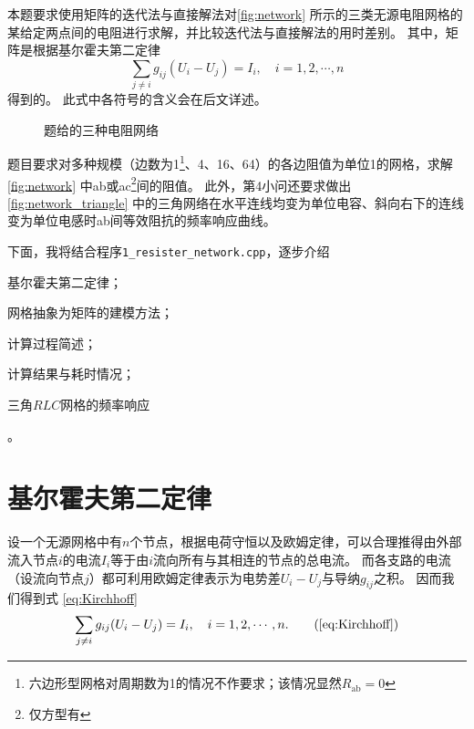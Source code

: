 本题要求使用矩阵的迭代法与直接解法对\autoref{fig:network} 所示的三类无源电阻网格的某给定两点间的电阻进行求解，并比较迭代法与直接解法的用时差别。
其中，矩阵是根据基尔霍夫第二定律
\begin{equation}\label{eq:Kirchhoff}
    \sum_{j\neq i} {g_{ij}(U_i-U_j)} = I_i,\quad i=1,2,\cdots,n
\end{equation}
得到的。
此式中各符号的含义会在后文详述。

\begin{figure}
    \centering
    \caption{题给的三种电阻网络}
    \label{fig:network}
\end{figure}

题目要求对多种规模（边数为1\footnote{六边形型网格对周期数为1的情况不作要求；该情况显然$R_\text{ab}=0$}、4、16、64）的各边阻值为单位1的网格，求解\autoref{fig:network} 中ab或ac\footnote{仅方型有}间的阻值。
此外，第4小问还要求做出\autoref{fig:network_triangle} 中的三角网络在水平连线均变为单位电容、斜向右下的连线变为单位电感时ab间等效阻抗的频率响应曲线。

下面，我将结合程序\verb|1_resister_network.cpp|，逐步介绍
\begin{inparaenum}
    \item 基尔霍夫第二定律；
    \item 网格抽象为矩阵的建模方法；
    \item 计算过程简述；
    \item 计算结果与耗时情况；
    \item 三角$RLC$网格的频率响应
\end{inparaenum}。

\section{基尔霍夫第二定律}

设一个无源网格中有$n$个节点，根据电荷守恒以及欧姆定律，可以合理推得由外部流入节点$i$的电流$I_i$等于由$i$流向所有与其相连的节点的总电流。
而各支路的电流（设流向节点$j$）都可利用欧姆定律表示为电势差$U_i-U_j$与导纳$g_{ij}$之积。
因而我们得到式 \eqref{eq:Kirchhoff}\begin{equation}
    \sum_{j\neq i} {g_{ij}(U_i-U_j)} = I_i,\quad i=1,2,\cdots,n.\tag{\ref{eq:Kirchhoff}}
\end{equation}

